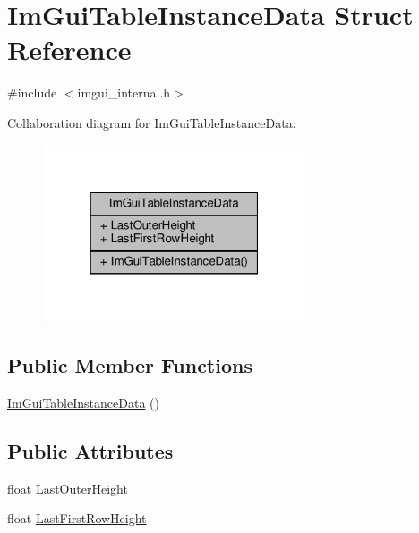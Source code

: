 \hypertarget{structImGuiTableInstanceData}{}\section{Im\+Gui\+Table\+Instance\+Data Struct Reference}
\label{structImGuiTableInstanceData}


{\ttfamily \#include $<$imgui\+\_\+internal.\+h$>$}



Collaboration diagram for Im\+Gui\+Table\+Instance\+Data\+:
\nopagebreak
\begin{figure}[H]
\begin{center}
\leavevmode
\includegraphics[width=220pt]{structImGuiTableInstanceData__coll__graph}
\end{center}
\end{figure}
\subsection*{Public Member Functions}
\begin{DoxyCompactItemize}
\item 
\hyperlink{structImGuiTableInstanceData_ace9c6bc325970e1d41321d55d06cc079}{Im\+Gui\+Table\+Instance\+Data} ()
\end{DoxyCompactItemize}
\subsection*{Public Attributes}
\begin{DoxyCompactItemize}
\item 
float \hyperlink{structImGuiTableInstanceData_a1073630b1f76c3281c40bf9097784961}{Last\+Outer\+Height}
\item 
float \hyperlink{structImGuiTableInstanceData_a741a20bf38ef3d9928d24a6aa480c325}{Last\+First\+Row\+Height}
\end{DoxyCompactItemize}


